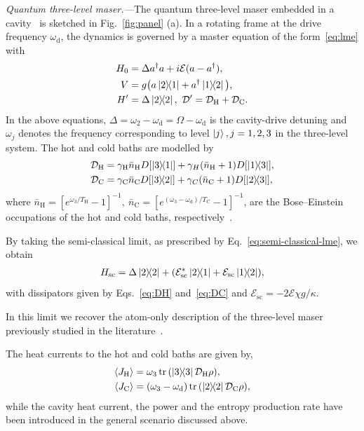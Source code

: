 \documentclass[aps,twocolumn,10pt,prl,floatfix,nofootinbib, superscriptaddress]{revtex4-2}
\newcommand{\nb}{\bar{n}}
\begin{document}
\textit{Quantum three-level maser.—}The quantum three-level maser embedded in a cavity~\cite{Li2017, Dorfman2018, Niedenzu2019} is sketched in Fig.~\ref{fig:panel} (a). In a rotating frame at the drive frequency $\omega_\text{d}$, the dynamics is governed by a master equation of the form~\eqref{eq:lme} with
\begin{align}
    H_0 &= \Delta a^\dagger a + i\mathcal{E}(a - a^\dagger),\\
    V &=  g\big(a\dyad{2}{1} + a^\dagger\dyad{1}{2}\big), \label{eq:ham}\\
    H'&=\Delta \dyad{2}{2},~
    \mathcal{D}' = \mathcal{D}_\text{H} + \mathcal{D}_\text{C}.
\end{align}
In the above equations, $\Delta = \omega_{2} -\omega_\text{d}= \Omega -\omega_\text{d}$ is the cavity-drive detuning and $\omega_j$ denotes the  frequency corresponding to level $\ket{j},j=1,2,3$ in the three-level system. The hot and cold baths are modelled by
\begin{align}
\mathcal{D}_\text{H} &= \gamma_\text{H} \nb_\text{H}D[\dyad{3}{1}] + \gamma_H (\nb_\text{H}+1)D[\dyad{1}{3}],\label{eq:DH}\\
\mathcal{D}_\text{C} &= \gamma_\text{C} \nb_\text{C}D[\dyad{3}{2}] + \gamma_C (\nb_\text{C}+1)D[\dyad{2}{3}],\label{eq:DC}
\end{align}
where $\nb_\text{H} = [e^{\omega_3/T_\text{H}}-1]^{-1},~\nb_\text{C} = [e^{(\omega_3-\omega_\text{d})/T_\text{C}}-1]^{-1}$,  are the Bose--Einstein occupations of the hot and cold baths, respectively~\cite{Wacker2022, schrauwen2025}.


By taking the semi-classical limit, as prescribed by Eq.~\eqref{eq:semi-classical-lme}, we obtain
\begin{align}
    H_\text{sc} = \Delta \dyad{2}{2} + \qty(\mathcal{E}_\text{sc}^* \dyad{2}{1} + \mathcal{E}_\text{sc} \dyad{1}{2}),
\end{align}
with dissipators given by Eqs.~\eqref{eq:DH} and~\eqref{eq:DC} and
$\mathcal{E}_\text{sc} = -2\mathcal{E} \chi g/\kappa$.

In this limit we recover the atom-only description of the three-level maser previously studied in the literature~\cite{Geusic1967, kosloff_1984, Mitchison2019, Kalaee_2021}.


The heat currents to the hot and cold baths are given by,
\begin{align}
    \langle J_\text{H}\rangle &= \omega_3 \tr\qty( \dyad{3}{3}\mathcal{D}_\text{H} \rho),\\
    \langle J_\text{C}\rangle &= (\omega_3 - \omega_\text{d}) \tr\qty(\dyad{2}{2} \mathcal{D}_\text{C} \rho),
\end{align}
while the cavity heat current, the power and the entropy production rate have been introduced in the general scenario discussed above.
\end{document}
